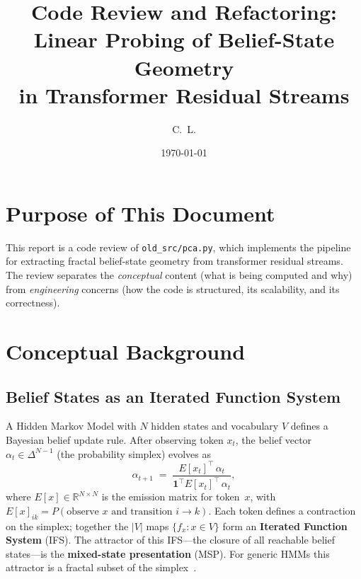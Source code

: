 \documentclass[11pt]{article}
\title{Code Review and Refactoring: Linear Probing of Belief-State Geometry\\in Transformer Residual Streams}
\author{C.~L.}
\date{\today}
\newcommand{\file}[1]{\texttt{#1}}
\begin{document}
\maketitle
\tableofcontents
\bigskip

\section{Purpose of This Document}

This report is a code review of \file{old\_src/pca.py}, which implements the pipeline for extracting fractal belief-state geometry from transformer residual streams.  The review separates the \emph{conceptual} content (what is being computed and why) from \emph{engineering} concerns (how the code is structured, its scalability, and its correctness).

\section{Conceptual Background}

\subsection{Belief States as an Iterated Function System}

A Hidden Markov Model with $N$ hidden states and vocabulary $V$ defines a Bayesian belief update rule.  After observing token $x_t$, the belief vector $\alpha_t \in \Delta^{N-1}$ (the probability simplex) evolves as
\begin{equation}\label{eq:belief-update}
  \alpha_{t+1} \;=\; \frac{E[x_t]^\top\, \alpha_t}{\mathbf{1}^\top E[x_t]^\top\, \alpha_t},
\end{equation}
where $E[x] \in \mathbb{R}^{N \times N}$ is the emission matrix for token~$x$, with $E[x]_{ik} = P(\text{observe } x \text{ and transition } i \to k)$.  Each token defines a contraction on the simplex; together the $|V|$ maps $\{f_x : x \in V\}$ form an \textbf{Iterated Function System} (IFS).  The attractor of this IFS---the closure of all reachable belief states---is the \textbf{mixed-state presentation} (MSP).  For generic HMMs this attractor is a fractal subset of the simplex~\cite{jurgens2021entropy, crutchfield1994}.
\end{document}
